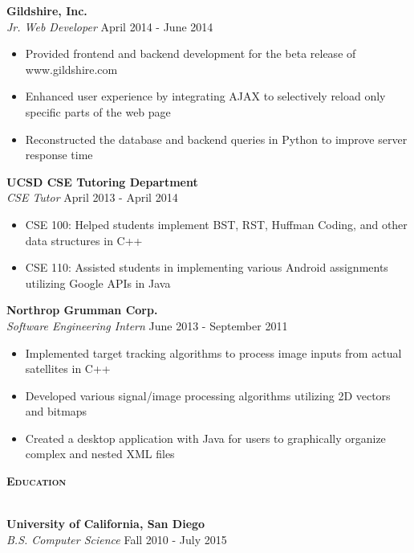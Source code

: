 \documentclass{article}
\newcommand{\lineunder} {
    \vspace*{-8pt} \\
    \hspace*{-18pt} \hrulefill \\
}
\newcommand{\header} [1] {
    {\hspace*{-18pt}\vspace*{6pt} \large{\textbf{\textsc{#1}}}}
    \vspace*{-6pt} \lineunder
}
\begin{document}
\textbf{Gildshire, Inc.} \hfill \\
\textit{Jr. Web Developer} \hfill April 2014 - June 2014
\vspace{-1mm}
\begin{itemize} \itemsep -1pt
	\item Provided frontend and backend development for the beta release of www.gildshire.com
	\item Enhanced user experience by integrating AJAX to selectively reload only specific parts of the web page
	\item Reconstructed the database and backend queries in Python to improve server response time
\end{itemize}

\textbf{UCSD CSE Tutoring Department} \hfill \\
\textit{CSE Tutor} \hfill April 2013 - April 2014
\vspace{-1mm}
\begin{itemize} \itemsep -1pt
	\item CSE 100: Helped students implement BST, RST, Huffman Coding, and other data structures in C++
	\item CSE 110: Assisted students in implementing various Android assignments utilizing Google APIs in Java
\end{itemize}

\textbf{Northrop Grumman Corp.} \\
\textit{Software Engineering Intern} \hfill June 2013 - September 2011
\vspace{-1mm}
\begin{itemize} \itemsep -1pt
	\item Implemented target tracking algorithms to process image inputs from actual satellites in C++
	\item Developed various signal/image processing algorithms utilizing 2D vectors and bitmaps
	\item Created a desktop application with Java for users to graphically organize complex and nested XML files
\end{itemize}

\header{Education}
\vspace{1mm}

\textbf{University of California, San Diego}\hfill \\
\textit{B.S. Computer Science} \hfill Fall 2010 - July 2015\\
\vspace{2mm}
\end{document}
